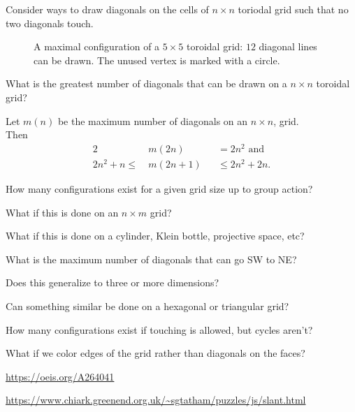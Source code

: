 \documentclass{article}
\begin{document}
Consider ways to draw diagonals on the cells of $n \times n$ toriodal grid such
that no two diagonals touch.
\begin{figure}[ht!]
  \centering
  \caption{
    A maximal configuration of a $5 \times 5$ toroidal grid: $12$ diagonal lines
    can be drawn. The unused vertex is marked with a circle.
  }
\end{figure}
\begin{question}
  What is the greatest number of diagonals that can be drawn on a $n \times n$
  toroidal grid?
\end{question}

\begin{note}
  Let $m(n)$ be the maximum number of diagonals on an $n \times n$, grid.\\
  Then \begin{alignat*}{2}
  & m(2n) &&= 2n^2 \text{ and}\\
  2n^2 + n \leq\ & m(2n + 1) &&\leq 2n^2 + 2n.
\end{alignat*}
\end{note}

\begin{related}
  \item How many configurations exist for a given grid size up to group action?
  \item What if this is done on an $n \times m$ grid?
  \item What if this is done on a cylinder, Klein bottle, projective space, etc?
  \item What is the maximum number of diagonals that can go SW to NE?
  \item Does this generalize to three or more dimensions?
  \item Can something similar be done on a hexagonal or triangular grid?
  \item How many configurations exist if touching is allowed, but cycles aren't?
  \item What if we color edges of the grid rather than diagonals on the faces?
\end{related}

\begin{references}
  \item \url{https://oeis.org/A264041}
  \item \url{https://www.chiark.greenend.org.uk/~sgtatham/puzzles/js/slant.html}
\end{references}
\end{document}
